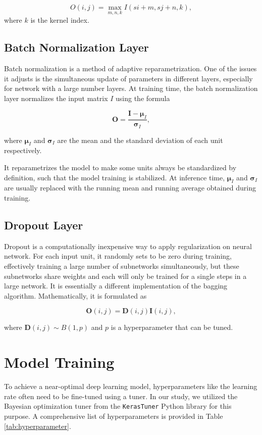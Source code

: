 \documentclass[]{interact}
\theoremstyle{plain}%
\theoremstyle{definition}
\theoremstyle{remark}
\begin{document}
\[O(i, j) = \underset{m,n,k}{\max} I(si + m,sj+n,k),\] where \(k\) is
the kernel index.

\subsection{Batch Normalization Layer}\label{batch-normalization-layer}

Batch normalization is a method of adaptive reparametrization. One of
the issues it adjusts is the simultaneous update of parameters in
different layers, especially for network with a large number layers. At
training time, the batch normalization layer normalizes the input matrix
\(I\) using the formula

\[\boldsymbol{O} = \frac{\boldsymbol{I} - \boldsymbol{\mu}_I}{\boldsymbol{\sigma}_I},\]

where \(\boldsymbol{\mu}_I\) and \(\boldsymbol{\sigma}_I\) are the mean
and the standard deviation of each unit respectively.

It reparametrizes the model to make some units always be standardized by
definition, such that the model training is stabilized. At inference
time, \(\boldsymbol{\mu}_I\) and \(\boldsymbol{\sigma}_I\) are usually
replaced with the running mean and running average obtained during
training.

\subsection{Dropout Layer}\label{dropout-layer}

Dropout is a computationally inexpensive way to apply regularization on
neural network. For each input unit, it randomly sets to be zero during
training, effectively training a large number of subnetworks
simultaneously, but these subnetworks share weights and each will only
be trained for a single steps in a large network. It is essentially a
different implementation of the bagging algorithm. Mathematically, it is
formulated as

\[\boldsymbol{O}(i,j) = \boldsymbol{D}(i,j)\boldsymbol{I}(i,j),\]

where \(\boldsymbol{D}(i,j) \sim B(1, p)\) and \(p\) is a hyperparameter
that can be tuned.

\section{Model Training}\label{sec-model-training}

To achieve a near-optimal deep learning model, hyperparameters like the
learning rate often need to be fine-tuned using a tuner. In our study,
we utilized the Bayesian optimization tuner from the \texttt{KerasTuner}
Python library \citep{omalley2019kerastuner} for this purpose. A
comprehensive list of hyperparameters is provided in Table
\ref{tab:hyperparameter}.
\end{document}
